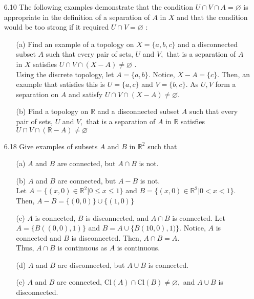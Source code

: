 \documentclass[12pt]{article}
\newcommand{\R}{\mathbb{R}}
\begin{document}
\begin{enumerate}
		\item[6.10] The following examples demonstrate that the condition $U \cap V \cap A = \varnothing$ is appropriate in the definition of a separation of $A$ in $X$ and that the condition would be too strong if it required $U \cap V = \varnothing$ :
		\begin{enumerate}
			\item[(a)] Find an example of a topology on $X = \{ a , b , c \}$ and a disconnected subset
			$A$ such that every pair of sets, $U$ and $V ,$ that is a separation of $A$ in $X$
			satisfies $U \cap V \cap ( X - A ) \neq \varnothing$ .\\
			Using the discrete topology, let $ A = \{a,b\} $. Notice, $ X-A =\{c\} $. Then, an example that satisfies this is $ U = \{a,c\} $ and $ V = \{b,c\} $. As $ U,V $ form a separation on $ A $ and satisfy $U \cap V \cap ( X - A ) \neq \varnothing$. 
			\item[(b)] Find a topology on $\mathbb { R }$ and a disconnected subset $A$ such that every pair of
			sets, $U$ and $V ,$ that is a separation of $A$ in $\mathbb { R }$ satisfies $U \cap V \cap ( \mathbb { R } - A ) \neq \varnothing$
		\end{enumerate}
		\item[6.18] Give examples of subsets $A$ and $B$ in $\mathbb { R } ^ { 2 }$ such that
		\begin{enumerate}
			\item[(a)] $A$ and $B$ are connected, but $A \cap B$ is not.
			\item[(b)] $A$ and $B$ are connected, but $A - B$ is not.\\
				Let $ A = \{(x,0)\in \R^2|0\leq x\leq1\} $ and $ B=\{(x,0)\in \R^2|0<x<1\} $. Then, $ A-B= \{(0,0)\}\cup\{(1,0)\} $
			\item[(c)] $A$ is connected, $B$ is disconnected, and $A \cap B$ is connected.
				Let $A= \{B((0,0),1)\}$ and $ B=A\cup\{B(10,0),1)\} $. Notice, $ A $ is connected and $ B $ is disconnected. Then, $ A\cap B = A$.\\
				 Thus, $ A\cap B $ is continuous as $ A $ is continuous.
			\item[(d)] $A$ and $B$ are disconnected, but $A \cup B$ is connected.
			\item[(e)] $A$ and $B$ are connected, $\mathrm { Cl } ( A ) \cap \mathrm { Cl } ( B ) \neq \varnothing ,$ and $A \cup B$ is disconnected.
		\end{enumerate}
		

\end{enumerate}
\end{document}
